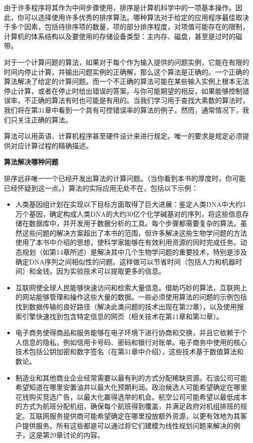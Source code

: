 \documentclass[lang=cn,newtx,10pt,scheme=chinese]{elegantbook}
\begin{document}
由于许多程序将其作为中间步骤使用，排序是计算机科学中的一项基本操作。因此，你可以选择使用许多优秀的排序算法。哪种算法对于给定的应用程序最佳取决于多个因素，包括待排序项的数量，项的部分排序程度，对项值可能存在的限制，计算机的体系结构以及要使用的存储设备类型：主内存、磁盘，甚至是过时的磁带。

对于一个计算问题的算法，如果对于每个作为输入提供的问题实例，它能在有限的时间内停止计算，并输出问题实例的正确解，那么这个算法是正确的。一个正确的算法解决了给定的计算问题。而一个不正确的算法可能在某些输入实例上根本无法停止计算，或者在停止时给出错误的答案。与你可能期望的相反，如果能够控制错误率，不正确的算法有时也可能是有用的。当我们学习用于查找大素数的算法时，我们将在第31章中看到一个具有可控错误率的算法的例子。然而，通常情况下，我们只关注正确的算法。

算法可以用英语、计算机程序甚至硬件设计来进行规定。唯一的要求是规定必须提供对应计算过程的精确描述。

\textbf{算法解决哪种问题}

排序远非唯一一个已经开发出算法的计算问题。（当你看到本书的厚度时，你可能已经怀疑到这一点。）算法的实际应用无处不在，包括以下示例：

\begin{itemize}
    \item 人类基因组计划在实现以下目标方面取得了巨大进展：鉴定人类DNA中大约3万个基因，确定构成人类DNA的大约30亿个化学碱基对的序列，将这些信息存储在数据库中，并开发用于数据分析的工具。每个步骤都需要复杂的算法。虽然这些问题的解决方案超出了本书的范围，但许多解决这些生物学问题的方法使用了本书中介绍的思想，使科学家能够在有效利用资源的同时完成任务。动态规划（如第14章所述）是解决其中几个生物学问题的重要技术，特别是涉及确定DNA序列之间相似性的问题。这样做可以节省时间（包括人力和机器时间）和金钱，因为实验技术可以提取更多的信息。
    \item 互联网使全球人民能够快速访问和检索大量信息。借助巧妙的算法，互联网上的网站能够管理和操作这些大量的数据。一些必须使用算法的问题的示例包括找到数据传输的良好路径（解决此类问题的技术出现在第22章），以及使用搜索引擎快速找到包含特定信息的网页（相关技术在第11章和第32章）。
    \item 电子商务使得商品和服务能够在电子环境下进行协商和交换，并且它依赖于个人信息的隐私，例如信用卡号码、密码和银行对账单。电子商务中使用的核心技术包括公钥加密和数字签名（在第31章中介绍），这些技术基于数值算法和数论。
    \item 制造业和其他商业企业经常需要以最有利的方式分配稀缺资源。石油公司可能希望知道在哪里安置油井以最大化预期利润。政治候选人可能希望确定在哪里花钱购买竞选广告，以最大化赢得选举的机会。航空公司可能希望以最低成本的方式为航班分配机组，确保每个航班得到覆盖，并满足政府对机组排班的规定。互联网服务提供商可能希望确定在哪里投放额外资源，以更有效地为其客户提供服务。所有这些都是可以通过将它们建模为线性规划问题来解决的例子，这是第29章讨论的内容。
\end{itemize}
\end{document}

